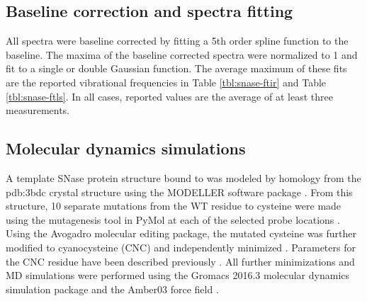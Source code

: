 %
%

\subsection{Baseline correction and spectra fitting}

All spectra were baseline corrected by fitting a 5th order spline function to the baseline. 
The maxima of the baseline corrected spectra were normalized to 1 and fit to a single or double Gaussian function. 
The average maximum of these fits are the reported vibrational frequencies in Table \ref{tbl:snase-ftir} and Table \ref{tbl:snase-ftls}. 
In all cases, reported values are the average of at least three measurements.

\subsection{Molecular dynamics simulations}

A template SNase protein structure bound to  was modeled by homology from the pdb:3bdc crystal structure using the MODELLER software package \cite{Castaneda2009, Mari-Renom2000}. 
From this structure, 10 separate mutations from the WT residue to cysteine were made using the mutagenesis tool in PyMol at each of the selected probe locations \cite{DeLano2002}. 
Using the Avogadro molecular editing package, the mutated cysteine was further modified to cyanocysteine (CNC) and independently minimized \cite{Hanwell2012}. 
Parameters for the CNC residue have been described previously \cite{Stafford2010, Ensign2011}. 
All further minimizations and MD simulations were performed using the Gromacs 2016.3 molecular dynamics simulation package\cite{Abraham2015, Berendsen1995, Hess2008, Lindahl2001, Pall2015, Pronk2013, VanDerSpoel20015} and the Amber03 force field \cite{Duan2003, Sorin2005}.

